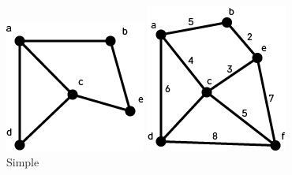 \documentclass[titlepage]{article}
\begin{document}
\begin{figure}[!htb]
  \includegraphics[width=\linewidth]{Simple.png}
  \caption{Simple}\label{fig:awesome_image1}
\endminipage\hfill
{}
  \includegraphics[width=\linewidth]{Weight.png}

\end{figure}
\end{document}
